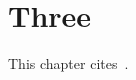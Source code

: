 \chapter{Three}
This chapter cites~\cite{vanhooland_dh_2012,mannens_compsac_2012}.

\printbibliography[heading=subbibliography]
